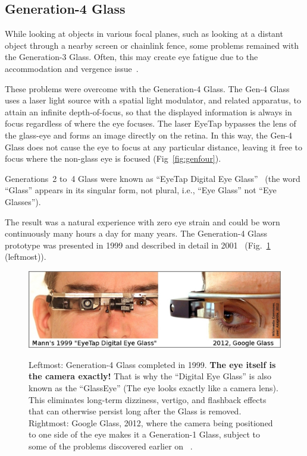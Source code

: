\subsection{Generation-4 Glass}
While looking at objects in various focal planes, such as looking at a distant object through a nearby 
screen or chainlink fence, some problems remained with the Generation-3 Glass. Often, this may 
create eye fatigue due to the accommodation and vergence issue~\cite{hoffman2008vergence}. 

These problems were overcome with the Generation-4 Glass.  The Gen-4 Glass uses a laser light 
source
with a spatial light modulator, and related apparatus, to attain an infinite depth-of-focus, so that the 
displayed information is always in focus regardless of where the eye focuses. The laser EyeTap 
bypasses the lens of the glass-eye and forms an image directly on the retina. In this way, the Gen-4 
Glass does not cause the eye to focus at any particular distance, leaving it free to focus where the 
non-glass eye is focused (Fig~\ref{fig:genfour}).

Generations~2 to~4 Glass were known as ``EyeTap Digital Eye Glass''~\cite{edeg} (the word ``Glass'' 
appears in its singular form, not plural, i.e., ``Eye Glass'' not ``Eye Glasses'').

The result was a natural experience with zero eye strain and could be worn continuously many hours 
a day for many years. The Generation-4 Glass prototype was presented in 1999 and described in 
detail in 2001~\cite{intelligentimageprocessing} (Fig.~\ref{fig:mann_glass_google} (leftmost)).

\begin{figure}
  \centering
  \includegraphics[width=5.5in]{ch6/figs/MannGlass_GoogleGlass_with_narrowborder_closer.jpg}\\
  \caption{Leftmost: Generation-4 Glass completed in 1999.
         {\bf The eye itself is the camera exactly!}
         That is why the ``Digital Eye Glass'' is also known as
         the ``GlassEye'' (The eye looks exactly like a camera lens).  This
         eliminates long-term dizziness, vertigo, and flashback effects
         that can otherwise persist long after the Glass is removed.
         Rightmost: Google Glass, 2012, where the camera being positioned to one
         side of the eye makes it a Generation-1 Glass, subject to some
         of the problems discovered earlier on ~\protect\cite{mann2013vision,mann2013freeglass}.
        }
  \label{fig:mann_glass_google}
\end{figure}


